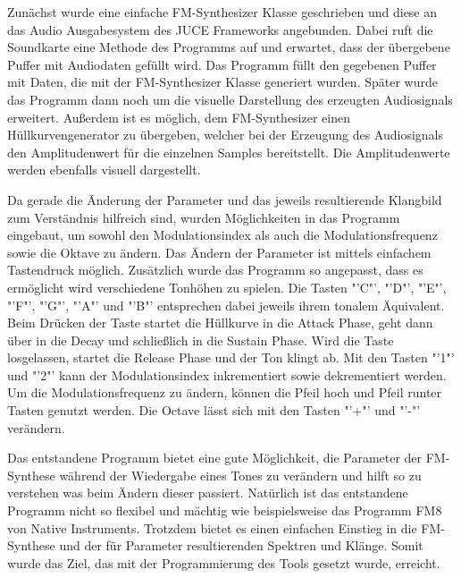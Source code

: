 Zunächst wurde eine einfache FM-Synthesizer Klasse geschrieben und diese an das Audio Ausgabesystem des JUCE Frameworks angebunden. Dabei ruft die Soundkarte eine Methode des Programms auf und erwartet, dass der übergebene Puffer mit Audiodaten gefüllt wird. Das Programm füllt den gegebenen Puffer mit Daten, die mit der FM-Synthesizer Klasse generiert wurden. Später wurde das Programm dann noch um die visuelle Darstellung des erzeugten Audiosignals erweitert. Außerdem ist es möglich, dem FM-Synthesizer einen Hüllkurvengenerator zu übergeben, welcher bei der Erzeugung des Audiosignals den Amplitudenwert für die einzelnen Samples bereitstellt. Die Amplitudenwerte werden ebenfalls visuell dargestellt.

Da gerade die Änderung der Parameter und das jeweils resultierende Klangbild zum Verständnis hilfreich sind, wurden Möglichkeiten in das Programm eingebaut, um sowohl den Modulationsindex als auch die Modulationsfrequenz sowie die Oktave zu ändern. Das Ändern der Parameter ist mittels einfachem Tastendruck möglich. Zusätzlich wurde das Programm so angepasst, dass es ermöglicht wird verschiedene Tonhöhen zu spielen. Die Tasten "'C"', "'D"', "'E"', "'F"', "'G"', "'A"' und "'B"' entsprechen dabei jeweils ihrem tonalem Äquivalent. Beim Drücken der Taste startet die Hüllkurve in die Attack Phase, geht dann über in die Decay und schließlich in die Sustain Phase. Wird die Taste losgelassen, startet die Release Phase und der Ton klingt ab. Mit den Tasten "'1"' und "'2"' kann der Modulationsindex inkrementiert sowie dekrementiert werden. Um die Modulationsfrequenz zu ändern, können die Pfeil hoch und Pfeil runter Tasten genutzt werden. Die Octave lässt sich mit den Tasten "'+"' und "'-"' verändern.

Das entstandene Programm bietet eine gute Möglichkeit, die Parameter der FM-Synthese während der Wiedergabe eines Tones zu verändern und hilft so zu verstehen was beim Ändern dieser passiert. Natürlich ist das entstandene Programm nicht so flexibel und mächtig wie beispielsweise das Programm FM8 von Native Instruments. Trotzdem bietet es einen einfachen Einstieg in die FM-Synthese und der für Parameter resultierenden Spektren und Klänge. Somit wurde das Ziel, das mit der Programmierung des Tools gesetzt wurde, erreicht.
\FloatBarrier
